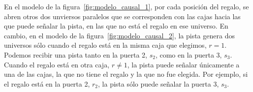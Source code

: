 \documentclass[a4paper,10pt]{book}
\theoremstyle{definition}
\begin{document}

En el modelo de la figura~\ref{fig:modelo_causal_1}, por cada posición del regalo, se abren otros dos unviersos paralelos que se corresponden con las cajas hacia las que puede señalar la pista, en las que no está el regalo en ese universo.
%
En cambio, en el modelo de la figura~\ref{fig:modelo_causal_2}, la pista genera dos universos sólo cuando el regalo está en la misma caja que elegimos, $r=1$.
%
Podemos recibir una pista tanto en la puerta 2, $s_2$, como en la puerta 3, $s_3$.
%
Cuando el regalo está en otra caja, $r\neq 1$, la pista puede señalar únicamente a una de las cajas, la que no tiene el regalo y la que no fue elegida.
%
Por ejemplo, si el regalo está en la puerta 2, $r_2$, la pista sólo puede señalar la puerta 3, $s_3$.

\end{document}
